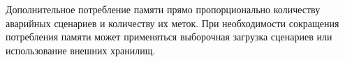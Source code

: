 Дополнительное потребление памяти прямо пропорционально количеству аварийных сценариев и количеству их меток.
При необходимости сокращения потребления памяти может применяться выборочная загрузка сценариев или использование внешних хранилищ.





